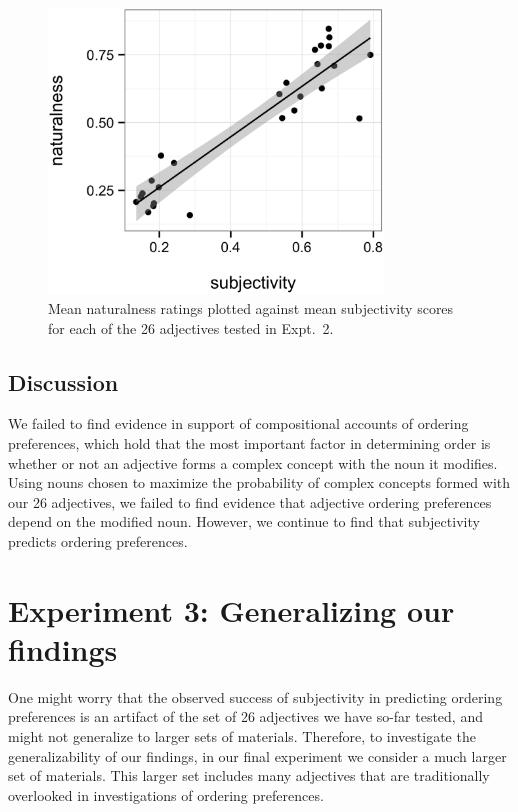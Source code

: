 \documentclass[12pt]{article}
\begin{document}
\begin{figure}
	\centering\includegraphics[width=3.5in]{plots/naturalness-subjectivity-new-nouns.eps}
	\caption{Mean naturalness ratings plotted against mean subjectivity scores for each of the 26 adjectives tested in Expt.~2.}\label{fig:subjectivity}
\end{figure}

\subsection{Discussion}

We  failed to find evidence in support of compositional accounts of ordering preferences, which hold that the most important factor in determining order is whether or not an adjective forms a complex concept with the noun it modifies. Using nouns chosen to maximize the probability of complex concepts formed with our 26 adjectives, we failed to find evidence that adjective ordering preferences depend on the modified noun. However, we continue to find that subjectivity predicts ordering preferences.


\section{Experiment 3: Generalizing our findings}

One might worry that the observed success of subjectivity in predicting ordering preferences is an artifact of the set of 26 adjectives we have so-far tested, and might not generalize to larger sets of materials. Therefore, to investigate the generalizability of our findings, in our final experiment we consider a much larger set of materials. This larger set includes many adjectives that are traditionally overlooked in investigations of ordering preferences.
\end{document}
